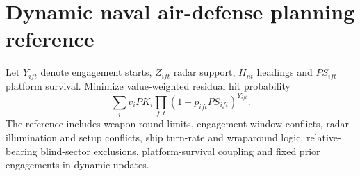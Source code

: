 \section*{Dynamic naval air-defense planning reference}
Let \(Y_{ift}\) denote engagement starts, \(Z_{ift}\) radar support, \(H_{nt}\) headings and \(PS_{ift}\) platform survival. Minimize value-weighted residual hit probability
\[
\sum_i v_i PK_i \prod_{f,t} (1-p_{ift}PS_{ift})^{Y_{ift}}.
\]
The reference includes weapon-round limits, engagement-window conflicts, radar illumination and setup conflicts, ship turn-rate and wraparound logic, relative-bearing blind-sector exclusions, platform-survival coupling and fixed prior engagements in dynamic updates.
